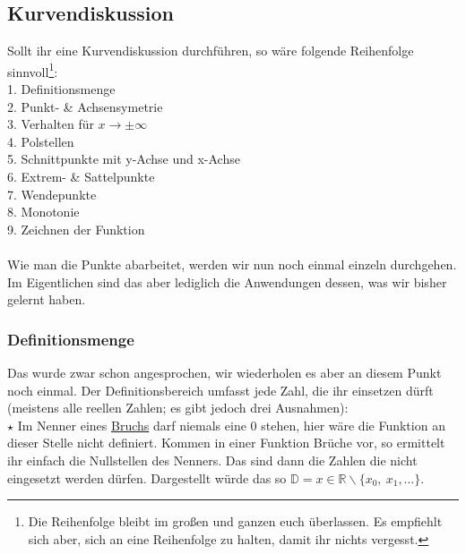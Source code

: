 \subsection{Kurvendiskussion}
	Sollt ihr eine Kurvendiskussion durchführen, so wäre folgende Reihenfolge
	sinnvoll\footnote{Die Reihenfolge bleibt im großen und ganzen euch überlassen.
	Es empfiehlt sich aber, sich an eine Reihenfolge zu halten, damit ihr nichts
	vergesst.}:\\
	1. Definitionsmenge\\
	2. Punkt- \& Achsensymetrie\\
	3. Verhalten für \(x \rightarrow \pm \infty\)\\
	4. Polstellen\\
	5. Schnittpunkte mit y-Achse und x-Achse\\
	6. Extrem- \& Sattelpunkte\\
	7. Wendepunkte\\
	8. Monotonie\\
	9. Zeichnen der Funktion\\ \\
	Wie man die Punkte abarbeitet, werden wir nun noch einmal einzeln durchgehen.
	Im Eigentlichen sind das aber lediglich die Anwendungen dessen, was wir bisher
	gelernt haben.

	\subsubsection{Definitionsmenge}
		Das wurde zwar schon angesprochen, wir wiederholen es aber an diesem Punkt
		noch einmal. Der Definitionsbereich umfasst jede Zahl, die ihr einsetzen dürft
		(meistens alle reellen Zahlen; es gibt jedoch drei Ausnahmen):\\

		\(\star\) Im Nenner eines \underline{Bruchs} darf niemals eine 0 stehen, hier
		wäre die Funktion an dieser Stelle nicht definiert. Kommen in einer Funktion
		Brüche vor, so ermittelt ihr einfach die Nullstellen des Nenners. Das sind
		dann die Zahlen die nicht eingesetzt werden dürfen. Dargestellt würde das so
		\(\mathbb D = x \in \mathbb R \backslash\{x_0,\ x_1, \ldots \}\).\\

